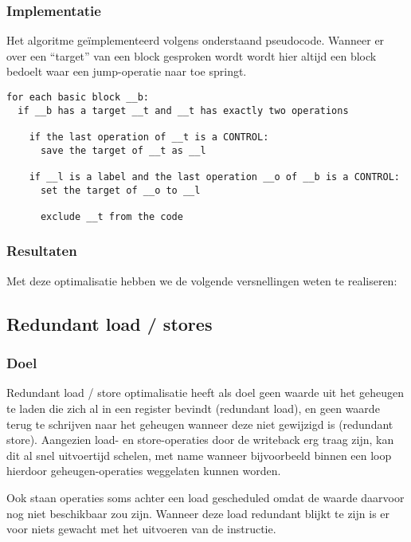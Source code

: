 \documentclass[a4paper,10pt]{article}
\begin{document}
\subsubsection{Implementatie}
Het algoritme ge\"implementeerd volgens onderstaand pseudocode. Wanneer er over
een ``target'' van een block gesproken wordt wordt hier altijd een block
bedoelt waar een jump-operatie naar toe springt.
\begin{verbatim}
for each basic block __b:
  if __b has a target __t and __t has exactly two operations 

    if the last operation of __t is a CONTROL:
      save the target of __t as __l
    
    if __l is a label and the last operation __o of __b is a CONTROL:
      set the target of __o to __l

      exclude __t from the code
\end{verbatim}

\subsubsection{Resultaten}
Met deze optimalisatie hebben we de volgende versnellingen weten te 
realiseren:

\subsection{Redundant load / stores}
\subsubsection{Doel}
Redundant load / store optimalisatie heeft als doel geen waarde uit het
geheugen te laden die zich al in een register bevindt (redundant load), en geen
waarde terug te schrijven naar het geheugen wanneer deze niet gewijzigd is
(redundant store). Aangezien load- en store-operaties door de writeback erg
traag zijn, kan dit al snel uitvoertijd schelen, met name wanneer bijvoorbeeld
binnen een loop hierdoor geheugen-operaties weggelaten kunnen worden.

Ook staan operaties soms achter een load gescheduled omdat de waarde daarvoor
nog niet beschikbaar zou zijn. Wanneer deze load redundant blijkt te zijn is er
voor niets gewacht met het uitvoeren van de instructie.
\end{document}
